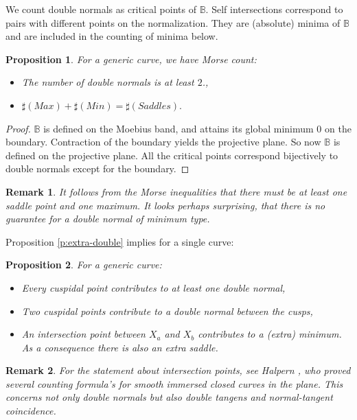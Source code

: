 \documentclass[12pt,a4,twoside]{amsart}
\newtheorem{prop}{Proposition}
\newtheorem*{main lemma}{The main lemma}
\newtheorem*{remark}{Remark}
\begin{document}
We count double normals as critical points of $\mathbb{B}$. Self intersections correspond to  pairs  with different points on the normalization. They are (absolute) minima of $\mathbb{B}$ and are included in the counting of minima below.

\begin{prop}\label{p:double-count}
 For a generic curve, we have Morse count: 
  \begin{itemize}
  \item The number of double normals is at least $2$.,
 \item  $\sharp(Max)+\sharp(Min) = \sharp(Saddles).$
 \end{itemize}
\end{prop}
\begin{proof}
  $\mathbb{B}$  is defined on the Moebius band, and attains its global minimum $0$ on the boundary. Contraction of the boundary yields the projective plane. So now $\mathbb{B}$ is defined on the projective plane. All the critical points correspond bijectively to double normals except for the  boundary.
\end{proof}

\begin{remark}
It follows from the Morse inequalities that there must be at least one saddle point and one maximum. It looks perhaps surprising, that there is no guarantee  for a double normal of minimum type. 
\end{remark}

Proposition \ref{p:extra-double} implies for a single curve:
\begin{prop}\label{p:extra-selfdouble}
For  a generic curve:
\begin{itemize}
\item Every   cuspidal point  contributes to at least one double normal,
\item Two cuspidal points contribute to a double normal between the cusps,
\item An intersection point between $X_a$ and $X_b$ contributes to a (extra) minimum. As a consequence there is also an extra saddle.
\end{itemize}
\end{prop}



\begin{remark} For the statement about intersection points, see  Halpern \cite{Halpern1}, who proved several counting formula's  for smooth immersed closed curves in the plane. This concerns not only double normals but also double tangens and normal-tangent coincidence. 
\end{remark}
\end{document}

